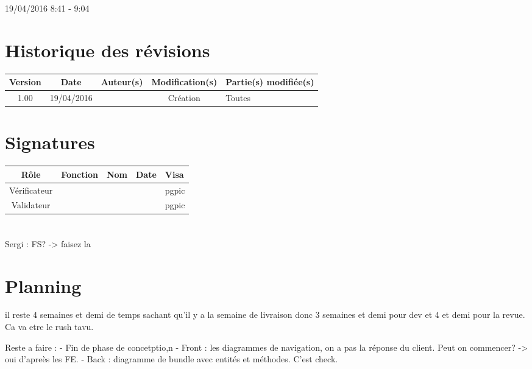 \documentclass [a4paper] {article}
\begin{document}
19/04/2016			 				%
\hfill   
\hfill 	 8:41 - 9:04 				%



\section*{Historique des révisions}
\begin{center}
			\begin{tabular}{| c | c | c | c | p{4cm} |}
				\hline
				\rowcolor{Gray}
				Version & Date & Auteur(s) & Modification(s) & Partie(s) modifiée(s)		 \\
				\hline
				1.00 & 19/04/2016 & \Pierre & Création & Toutes \\
		\hline		
			\end{tabular}
		\end{center}

\section*{Signatures}

		\begin{center}
			\begin{tabular}{| c | c | c | c | p{4cm} |}
				\hline
				\rowcolor{Gray}
				Rôle & Fonction & Nom & Date & Visa		 \\
				\hline
				Vérificateur & \RQA & \Kafui &  & pgpic \\[30pt]
				\hline
				Validateur & \CP & \Sergi &  & pgpic \\[30pt]	
				\hline
			\end{tabular}
		\end{center}



\section{\FS}
Sergi : FS? -> faisez la



\section{Planning}
il reste 4 semaines et demi de temps sachant qu'il y a la semaine de livraison donc 3 semaines et demi pour dev et 4 et demi pour la revue.
Ca va etre le rush tavu.

Reste a faire :
- Fin de phase de concetptio,n
- Front : les diagrammes de navigation, on a  pas la réponse du client. Peut on commencer? -> oui d'apreès les FE.
- Back : diagramme de bundle avec entités et méthodes. C'est check.
\end{document}
